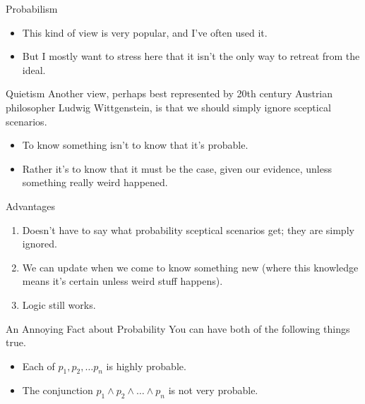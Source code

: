 \documentclass[
  17pt,
  letterpaper,
  ignorenonframetext,
  aspectratio=169,
  handout]{beamer}
\providecommand{\tightlist}{%
  \setlength{\itemsep}{0pt}\setlength{\parskip}{0pt}}\usepackage{longtable,booktabs,array}
\begin{document}
\begin{frame}{Probabilism}
\protect\hypertarget{probabilism-1}{}
\begin{itemize}[<+->]
\tightlist
\item
  This kind of view is very popular, and I've often used it.
\item
  But I mostly want to stress here that it isn't the only way to retreat
  from the ideal.
\end{itemize}
\end{frame}

\begin{frame}{Quietism}
\protect\hypertarget{quietism}{}
Another view, perhaps best represented by 20th century Austrian
philosopher Ludwig Wittgenstein, is that we should simply ignore
sceptical scenarios.

\begin{itemize}[<+->]
\tightlist
\item
  To know something isn't to know that it's probable.
\item
  Rather it's to know that it must be the case, given our evidence,
  unless something really weird happened.
\end{itemize}
\end{frame}

\begin{frame}{Advantages}
\protect\hypertarget{advantages}{}
\begin{enumerate}[<+->]
\tightlist
\item
  Doesn't have to say what probability sceptical scenarios get; they are
  simply ignored.
\item
  We can update when we come to know something new (where this knowledge
  means it's certain unless weird stuff happens).
\item
  Logic still works.
\end{enumerate}
\end{frame}

\begin{frame}{An Annoying Fact about Probability}
\protect\hypertarget{an-annoying-fact-about-probability}{}
You can have both of the following things true.

\begin{itemize}[<+->]
\tightlist
\item
  Each of \(p_1, p_2, \dots p_n\) is highly probable.
\item
  The conjunction \(p_1 \wedge p_2 \wedge \dots \wedge p_n\) is not very
  probable.
\end{itemize}
\end{frame}
\end{document}
